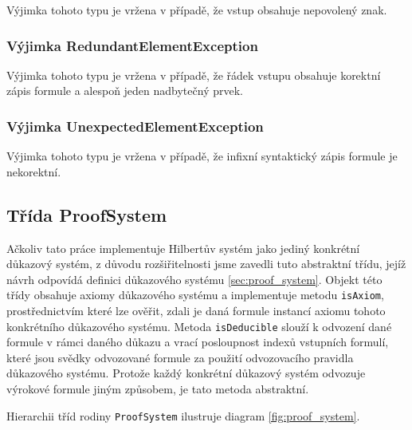 \documentclass[thesis=B,czech,hidelinks]{thesis}[2012/06/26]
\begin{document}
Výjimka tohoto typu je vržena v případě, že vstup obsahuje nepovolený znak.

\subsubsection{Výjimka RedundantElementException}

Výjimka tohoto typu je vržena v případě, že řádek vstupu obsahuje korektní zápis formule a alespoň jeden nadbytečný prvek.

\subsubsection{Výjimka UnexpectedElementException}

Výjimka tohoto typu je vržena v případě, že infixní syntaktický zápis formule je nekorektní.

\subsection{Třída ProofSystem}

Ačkoliv tato práce implementuje Hilbertův systém jako jediný konkrétní důkazový systém, z důvodu rozšiřitelnosti jsme zavedli tuto abstraktní třídu, jejíž návrh odpovídá definici důkazového systému \ref{sec:proof_system}. Objekt této třídy obsahuje axiomy důkazového systému a implementuje metodu \texttt{isAxiom}, prostřednictvím které lze ověřit, zdali je daná formule instancí axiomu tohoto konkrétního důkazového systému. Metoda \texttt{isDeducible} slouží k odvození dané formule v rámci daného důkazu a vrací posloupnost indexů vstupních formulí, které jsou svědky odvozované formule za použití odvozovacího pravidla důkazového systému. Protože každý konkrétní důkazový systém odvozuje výrokové formule jiným způsobem, je tato metoda abstraktní.

Hierarchii tříd rodiny \texttt{ProofSystem} ilustruje diagram \ref{fig:proof_system}.
\end{document}
